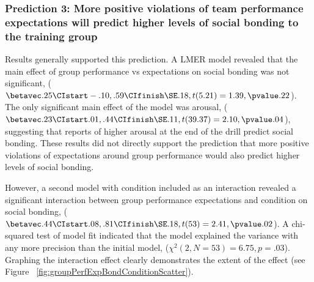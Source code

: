 












\subsubsection{Prediction 3: More positive violations of team performance expectations will predict higher levels of social bonding to the training group}


Results generally supported this prediction.  A LMER model revealed that the main effect of group performance vs expectations on social bonding was not significant, ($\betavec .25 \CIstart -.10, .59 \CIfinish \SE .18, t(5.21) = 1.39, \pvalue .22$).  The only significant main effect of the model was arousal, ($\betavec .23 \CIstart .01, .44 \CIfinish \SE .11, t(39.37) = 2.10, \pvalue .04$), suggesting that reports of higher arousal at the end of the drill predict social bonding.  These results did not directly support the prediction that more positive violations of expectations around group performance would also predict higher levels of social bonding.

However, a second model with condition included as an interaction revealed a significant interaction between group performance expectations and condition on social bonding, ($\betavec .44 \CIstart .08, .81 \CIfinish \SE .18, t(53) = 2.41, \pvalue .02$).  A chi-squared test of model fit indicated that the model explained the variance with any more precision than the initial model, ($\chi^2 (2, N = 53) = 6.75, p = .03$).  Graphing the interaction effect clearly demonstrates the extent of the effect (see Figure ~\ref{fig:groupPerfExpBondConditionScatter}).

